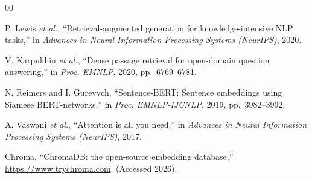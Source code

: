 \documentclass[conference]{IEEEtran}
\begin{document}
\begin{thebibliography}{00}

P. Lewis \textit{et al.}, ``Retrieval-augmented generation for
knowledge-intensive NLP tasks,'' in \textit{Advances in Neural
Information Processing Systems (NeurIPS)}, 2020.

V. Karpukhin \textit{et al.}, ``Dense passage retrieval for open-domain
question answering,'' in \textit{Proc. EMNLP}, 2020, pp.~6769--6781.

N. Reimers and I. Gurevych, ``Sentence-BERT: Sentence embeddings using
Siamese BERT-networks,'' in \textit{Proc. EMNLP-IJCNLP}, 2019,
pp.~3982--3992.

A. Vaswani \textit{et al.}, ``Attention is all you need,'' in
\textit{Advances in Neural Information Processing Systems (NeurIPS)},
2017.

Chroma, ``ChromaDB: the open-source embedding database,''
\url{https://www.trychroma.com}. (Accessed 2026).

\end{thebibliography}
\end{document}
